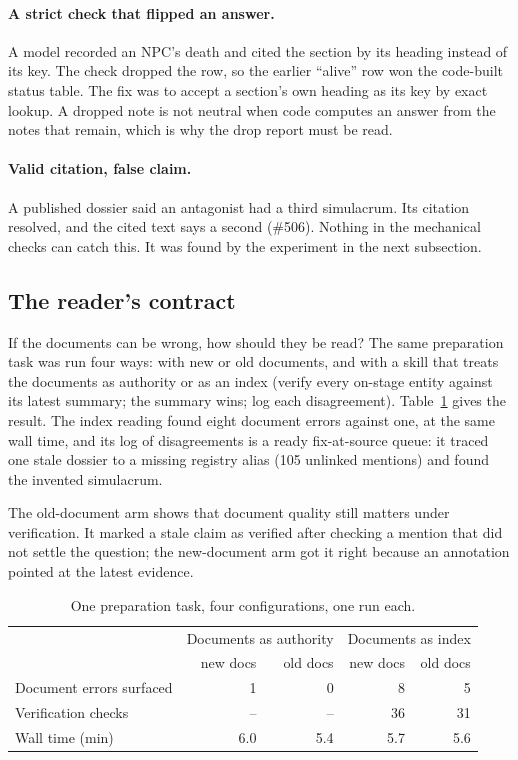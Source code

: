 \documentclass[11pt]{article}
\begin{document}
\paragraph{A strict check that flipped an answer.} A model recorded an NPC's death and
cited the section by its heading instead of its key. The check dropped the row, so the
earlier ``alive'' row won the code-built status table. The fix was to accept a section's
own heading as its key by exact lookup. A dropped note is not neutral when code computes
an answer from the notes that remain, which is why the drop report must be read.

\paragraph{Valid citation, false claim.} A published dossier said an antagonist had a
third simulacrum. Its citation resolved, and the cited text says a second (\#506).
Nothing in the mechanical checks can catch this. It was found by the experiment in the
next subsection.

\subsection{The reader's contract}

If the documents can be wrong, how should they be read? The same preparation task was
run four ways: with new or old documents, and with a skill that treats the documents as
authority or as an index (verify every on-stage entity against its latest summary; the
summary wins; log each disagreement). Table~\ref{tab:pointer} gives the result. The
index reading found eight document errors against one, at the same wall time, and its
log of disagreements is a ready fix-at-source queue: it traced one stale dossier to a
missing registry alias (105 unlinked mentions) and found the invented simulacrum.

The old-document arm shows that document quality still matters under verification. It
marked a stale claim as verified after checking a mention that did not settle the
question; the new-document arm got it right because an annotation pointed at the latest
evidence.

\begin{table}[t]
\centering
\small
\begin{tabular}{@{}lrrrr@{}}
\toprule
& \multicolumn{2}{c}{Documents as authority} & \multicolumn{2}{c}{Documents as index} \\
& new docs & old docs & new docs & old docs \\
\midrule
Document errors surfaced & 1 & 0 & 8 & 5 \\
Verification checks & -- & -- & 36 & 31 \\
Wall time (min) & 6.0 & 5.4 & 5.7 & 5.6 \\
\bottomrule
\end{tabular}
\caption{One preparation task, four configurations, one run each.}
\label{tab:pointer}
\end{table}
\end{document}
